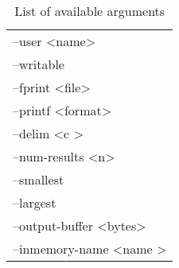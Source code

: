 \begin{table} [h]
\begin{tabular}{l}
--user \textless name\textgreater\\
--writable\\
--fprint \textless file\textgreater\\
--printf \textless format\textgreater\\
--delim \textless c \textgreater\\
--num-results \textless n\textgreater\\
--smallest\\
--largest\\
--output-buffer \textless bytes\textgreater\\
--inmemory-name \textless name \textgreater
\end{tabular}
\caption{\label{fig:gufi_find_arguments}List of available arguments}
\end{table}